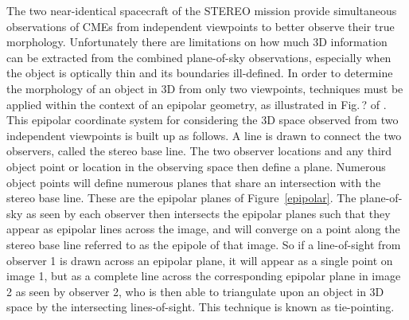 \documentclass[preprint2]{aastex}
\begin{document}
The two near-identical spacecraft of the STEREO mission provide simultaneous observations of CMEs from independent viewpoints to better observe their true morphology. Unfortunately there are limitations on how much 3D information can be extracted from the combined plane-of-sky observations, especially when the object is optically thin and its boundaries ill-defined. In order to determine the morphology of an object in 3D from only two viewpoints, techniques must be applied within the context of an epipolar geometry, as illustrated in Fig.\,? of \citep{2006astro.ph.12649I}. This epipolar coordinate system for considering the 3D space observed from two independent viewpoints is built up as follows. A line is drawn to connect the two observers, called the stereo base line. The two observer locations and any third object point or location in the observing space then define a plane. Numerous object points will define numerous planes that share an intersection with the stereo base line. These are the epipolar planes of Figure~\ref{epipolar}. The plane-of-sky as seen by each observer then intersects the epipolar planes such that they appear as epipolar lines across the image, and will converge on a point along the stereo base line referred to as the epipole of that image. So if a line-of-sight from observer 1 is drawn across an epipolar plane, it will appear as a single point on image 1, but as a complete line across the corresponding epipolar plane in image 2 as seen by observer 2, who is then able to triangulate upon an object in 3D space by the intersecting lines-of-sight. This technique is known as tie-pointing.
\end{document}

